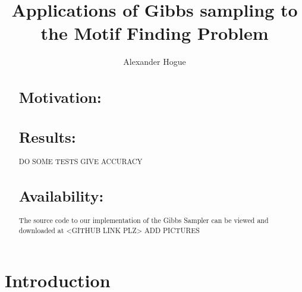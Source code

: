 \documentclass{bioinfo}
\begin{document}
\title[Gibbs Sampling]{Applications of Gibbs sampling to the Motif Finding Problem}
\author[Alexander Hogue]{Alexander Hogue}
\address{}
\history{}
\editor{}

\maketitle

\begin{abstract}

\section{Motivation:}

\section{Results:}
DO SOME TESTS
GIVE ACCURACY

\section{Availability:}
The source code to our implementation of the Gibbs Sampler can be viewed and downloaded at <GITHUB LINK PLZ>
ADD PICTURES
\end{abstract}

\section{Introduction}
\end{document}
